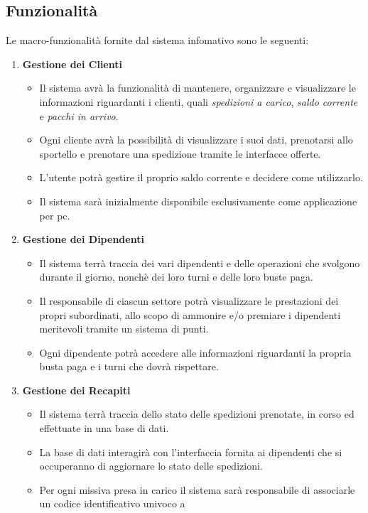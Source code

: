\documentclass[a4paper,12pt]{article}
\begin{document}
\subsection{Funzionalità}
Le macro-funzionalità fornite dal sistema infomativo sono le seguenti:
\begin{enumerate}
  \item \textbf{Gestione dei Clienti} \begin{itemize}
      \item Il sistema avrà la funzionalità di mantenere, organizzare e visualizzare le informazioni riguardanti i clienti, 
        quali \textit{spedizioni a carico}, \textit{saldo corrente} e \textit{pacchi in arrivo}.
      \item Ogni cliente avrà la possibilità di visualizzare i suoi dati, prenotarsi allo sportello e prenotare una spedizione 
        tramite le interfacce offerte.
      \item L'utente potrà gestire il proprio saldo corrente e decidere come utilizzarlo.
      \item Il sistema sarà inizialmente disponibile esclusivamente come applicazione per pc.
    \end{itemize}
  \item \textbf{Gestione dei Dipendenti} \begin{itemize}
      \item Il sistema terrà traccia dei vari dipendenti e delle operazioni che svolgono durante il giorno, nonchè dei loro 
        turni e delle loro buste paga.
      \item Il responsabile di ciascun settore potrà visualizzare le prestazioni dei propri subordinati, allo scopo di 
        ammonire e/o premiare i dipendenti meritevoli tramite un sistema di punti.
      \item Ogni dipendente potrà accedere alle informazioni riguardanti la propria busta paga e i turni che dovrà rispettare.
    \end{itemize}
  \item \textbf{Gestione dei Recapiti} \begin{itemize}
      \item Il sistema terrà traccia dello stato delle spedizioni prenotate, in corso ed effettuate in una base di dati.
      \item La base di dati interagirà con l'interfaccia fornita ai dipendenti che si occuperanno di aggiornare lo stato 
        delle spedizioni.
      \item Per ogni missiva presa in carico il sistema sarà responsabile di associarle un codice identificativo univoco a 

\end{itemize}
\end{enumerate}
\end{document}
